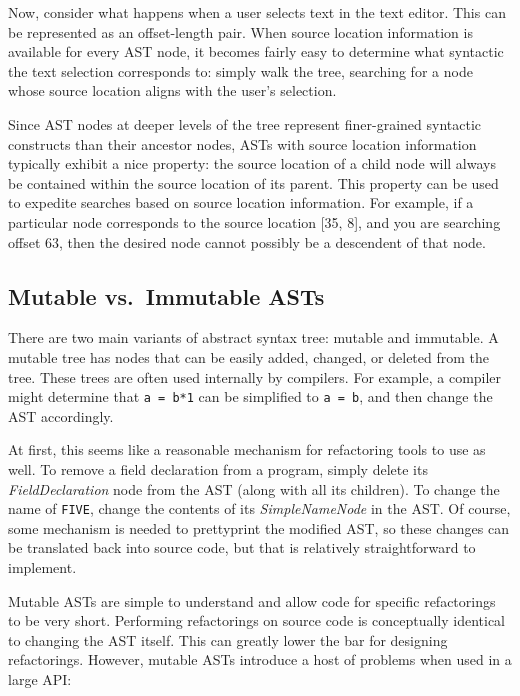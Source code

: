 \documentclass[prodmode]{acmlarge}
\newcommand{\ttt}[1]{\texttt{#1}}
\begin{document}
Now, consider what happens when a user selects text in the text editor.  This
can be represented as an offset-length pair.  When source location information
is available for every AST node, it becomes fairly easy to determine what
syntactic the text selection corresponds to: simply
walk the tree, searching for a node whose source location aligns with the
user's selection.

Since AST nodes at deeper levels of the tree represent finer-grained syntactic
constructs than their ancestor nodes, ASTs with source location information
typically exhibit a nice property: the source location of a child node will
always be contained within the source location of its parent.  This property
can be used to expedite searches based on source location information.  For
example, if a particular node corresponds to the source location [35, 8], and
you are searching offset 63, then the desired node cannot possibly be a
descendent of that node.


\subsection{Mutable vs.\ Immutable ASTs}
\label{ss:manip}

There are two main variants of abstract syntax tree:
mutable and immutable. A mutable tree has nodes that can be easily added, 
changed, or deleted from the tree. These trees are often used internally by
compilers. For example, a compiler might determine that
\ttt{a~=~b*1} can be simplified to \ttt{a~=~b}, and then change the AST 
accordingly.

At first, this seems like a reasonable mechanism for refactoring tools to use
as well.  To remove a field declaration from a program, simply delete its
\textit{FieldDeclaration} node from the AST (along with all its children).  To
change the name of \ttt{FIVE}, change the contents of its
\textit{SimpleNameNode} in the AST.  Of course, some mechanism is needed to
prettyprint the modified AST, so these changes can be translated back into
source code, but that is relatively straightforward to implement.

Mutable ASTs are simple to understand and allow code for specific refactorings
to be very short. Performing refactorings on source code is conceptually
identical to changing the AST itself. This can greatly lower the bar for 
designing refactorings. However, mutable ASTs introduce a host of problems when
used in a large API:
\end{document}
